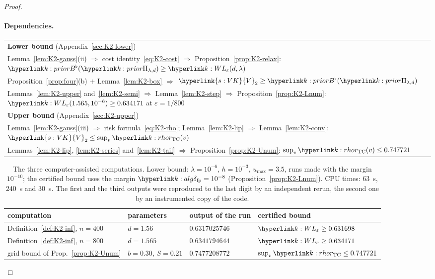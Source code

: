 \documentclass[11pt]{article}
\DeclareRobustCommand{\sy}[2]{{\hyperlink{#1}{#2}}}
\newcommand{\1}{\mathbf{1}}
\newcommand{\VK}{\sy{s:VK}{V}}
\begin{document}
\begin{proof}
\paragraph{Dependencies.}
\begin{center}\small
\begin{tabular}{@{}l@{}}
\hline
\textbf{Lower bound} (Appendix~\ref{sec:K2-lower})\\
Lemma~\ref{lem:K2-gauss}(ii) $\Rightarrow$ cost identity~\eqref{eq:K2-cost} $\Rightarrow$ Proposition~\ref{prop:K2-relax}: $\kBb(\kPri)\ge\kL(d,\lambda)$\\
Proposition~\ref{prop:four}(b) $+$ Lemma~\ref{lem:K2-box} $\Rightarrow$ $\VK_2\ge\kBb(\kPri)$\\
Lemmas~\ref{lem:K2-upper} and~\ref{lem:K2-semi} $\Rightarrow$ Lemma~\ref{lem:K2-step} $\Rightarrow$ Proposition~\ref{prop:K2-Lnum}: $\kL(1.565,10^{-6})\ge0.634171$ at $\varepsilon=1/800$\\
\hline
\textbf{Upper bound} (Appendix~\ref{sec:K2-upper})\\
Lemma~\ref{lem:K2-gauss}(iii) $\Rightarrow$ risk formula~\eqref{eq:K2-rho}; Lemma~\ref{lem:K2-lip} $\Rightarrow$ Lemma~\ref{lem:K2-conv}: $\VK_2\le\sup_v\kr(v)$\\
Lemmas~\ref{lem:K2-lip}, \ref{lem:K2-series} and~\ref{lem:K2-tail} $\Rightarrow$ Proposition~\ref{prop:K2-Unum}: $\sup_v\kr(v)\le0.747721$\\
\hline
\end{tabular}
\end{center}

\begin{table}[ht]\centering\small
\begin{tabular}{llll}
\hline
computation & parameters & output of the run & certified bound\\ \hline
Definition~\ref{def:K2-inf}, $n=400$ & $d=1.56$ & $0.6317025746$ & $\kL\ge0.631698$\\
Definition~\ref{def:K2-inf}, $n=800$ & $d=1.565$ & $0.6341794644$ & $\kL\ge0.634171$\\
grid bound of Prop.~\ref{prop:K2-Unum} & $b=0.30$, $S=0.21$ & $0.7477208772$ & $\sup_v\kr\le0.747721$\\
\hline
\end{tabular}
\caption{The three computer-assisted computations. Lower bound: $\lambda=10^{-6}$, $h=10^{-3}$, $u_{\max}=3.5$, runs made with the margin $10^{-10}$; the certified
bound uses the margin $\kdfp=10^{-8}$ (Proposition~\ref{prop:K2-Lnum}). CPU times: $63$~s, $240$~s and $30$~s. The first and the third outputs were reproduced to the
last digit by an independent rerun, the second one by an instrumented copy of the code.}\label{tab:K2-runs}
\end{table}
\end{proof}
\end{document}
